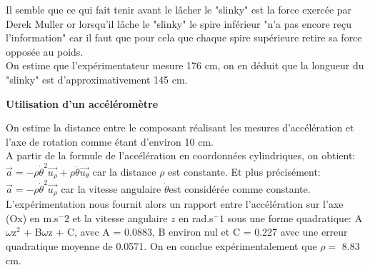 \documentclass{scrartcl}
\begin{document}
				Il semble que ce qui fait tenir avant le lâcher le "slinky" est la force exercée par Derek Muller or lorsqu'il lâche le "slinky" le spire inférieur "n'a pas encore reçu l'information" car il faut que pour cela que chaque spire supérieure retire sa force opposée au poids.\\
			On estime que l'expérimentateur mesure 176 cm, on en déduit que la longueur du "slinky" est d'approximativement 145 cm.%
			
			\bigskip\bigskip\huge\begin{center}\textbf{Utilisation d'un accéléromètre}\end{center}
			
			\noindent \normalsize On estime la distance entre le composant réalisant les mesures d'accélération et l'axe de rotation comme étant d'environ 10 cm.\\
			A partir de la formule de l'accélération en coordonnées cylindriques, on obtient: $\vec{a} = -\rho\dot{\theta}^2 \overrightarrow{u_\rho} + \rho\ddot{\theta} \overrightarrow{u_\theta}$ car la distance $\rho$ est constante. Et plus précisément: $\vec{a} = -\rho\dot{\theta}^2 \overrightarrow{u_\rho}$ car la vitesse angulaire $\dot{\theta}$est considérée comme constante.\\
			L'expérimentation nous fournit alors un rapport entre l'accélération sur l'axe (Ox) en m.s$^-2$ et la vitesse angulaire $z$ en rad.s$^-1$ sous une forme quadratique: A$\omega$z$^2$ + B$\omega$z + C, avec A = 0.0883, B environ nul et C = 0.227 avec une erreur quadratique moyenne de 0.0571. On en conclue expérimentalement que $\rho = $ 8.83 cm.
			
			
			
\end{document}

